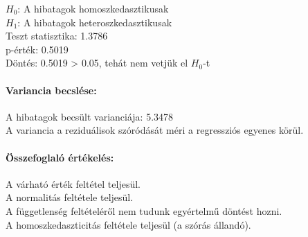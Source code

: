 \documentclass[11pt]{article}
\begin{document}
$H_0$: A hibatagok homoszkedasztikusak\\
$H_1$: A hibatagok heteroszkedasztikusak\\
Teszt statisztika: 1.3786\\
p-érték: 0.5019\\
Döntés: 0.5019 \textgreater{} 0.05, tehát nem vetjük el $H_0$-t

\paragraph{Variancia becslése:}\label{variancia-becsluxe9se}

A hibatagok becsült varianciája: 5.3478\\
A variancia a reziduálisok szóródását méri a regressziós egyenes körül.

\paragraph{Összefoglaló
értékelés:}\label{uxf6sszefoglaluxf3-uxe9rtuxe9keluxe9s}

A várható érték feltétel teljesül.\\
A normalitás feltétele teljesül.\\
A függetlenség feltételéről nem tudunk egyértelmű döntést hozni.\\
A homoszkedaszticitás feltétele teljesül (a szórás állandó).


    
    
    
\end{document}
